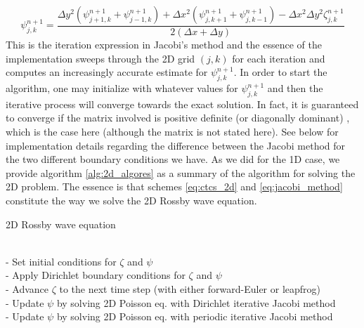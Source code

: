 \documentclass[12pt]{article}
\numberwithin{figure}{section}
\numberwithin{table}{section}
\begin{document}
\begin{equation}
	\psi_{j,k}^{n+1}=\frac{\Delta y^2(\psi_{j+1,k}^{n+1}+\psi_{j-1,k}^{n+1})+\Delta x^2(\psi_{j,k+1}^{n+1}+\psi_{j,k-1}^{n+1})-\Delta x^2\Delta y^2\zeta_{j,k}^{n+1}}{2(\Delta x+\Delta y)} \label{eq:jacobi_method}
\end{equation}
This is the iteration expression in Jacobi's method and the essence of the implementation sweeps through the 2D grid $(j,k)$ for each iteration and computes an increasingly accurate estimate for $\psi_{j,k}^{n+1}$. In order to start the algorithm, one may initialize with whatever values for $\psi_{j,k}^{n+1}$ and then the iterative process will converge towards the exact solution. In fact, it is guaranteed to converge if the matrix involved is positive definite (or diagonally dominant) \cite{Comp}, which is the case here (although the matrix is not stated here). See below for implementation details regarding the difference between the Jacobi method for the two different boundary conditions we have. As we did for the 1D case, we provide algorithm \ref{alg:2d_algores} as a summary of the algorithm for solving the 2D problem. The essence is that schemes \eqref{eq:ctcs_2d} and \eqref{eq:jacobi_method} constitute the way we solve the 2D Rossby wave equation.

\begin{algorithm}
\caption{2D Rossby wave equation} \label{alg:2d_algores}
\begin{algorithmic}[1000] \\
    \State - Set initial conditions for $\zeta$ and $\psi$ \\
    	\State - Apply Dirichlet boundary conditions for $\zeta$ and $\psi$
    \EndIf \\
    	\State - Advance $\zeta$ to the next time step (with either forward-Euler or leapfrog) \\
        
        	\State - Update $\psi$ by solving 2D Poisson eq. with Dirichlet iterative Jacobi method
    	\EndIf \\
        
        	\State - Update $\psi$ by solving 2D Poisson eq. with periodic iterative Jacobi method
    	\EndIf
    \EndWhile
\end{algorithmic}
\end{algorithm}

\end{document}

